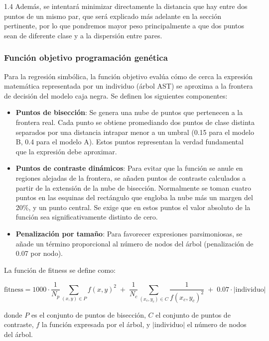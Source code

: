 \documentclass{article}
\begin{document}
\begin{spacing}{1.4}
Además, se intentará minimizar directamente la distancia que hay entre dos puntos de un mismo par, que será explicado más adelante
en la sección pertinente, por lo que pondremos mayor peso principalmente a que dos puntos sean de diferente clase y a la dispersión entre
pares. \\

\subsubsection{Función objetivo programación genética}

Para la regresión simbólica, la función objetivo evalúa cómo de cerca la expresión matemática representada por un individuo (árbol AST) se aproxima a la frontera de decisión del modelo caja negra. Se definen los siguientes componentes:

\begin{itemize}
    \item \textbf{Puntos de bisección}: Se genera una nube de puntos que pertenecen a la frontera real. Cada punto se obtiene promediando dos puntos de clase distinta separados por una distancia intrapar menor a un umbral (0.15 para el modelo B, 0.4 para el modelo A). Estos puntos representan la verdad fundamental que la expresión debe aproximar.
    
    \item \textbf{Puntos de contraste dinámicos}: Para evitar que la función se anule en regiones alejadas de la frontera, se añaden puntos de contraste calculados a partir de la extensión de la nube de bisección. Normalmente se toman cuatro puntos en las esquinas del rectángulo que engloba la nube más un margen del 20\%, y un punto central. Se exige que en estos puntos el valor absoluto de la función sea significativamente distinto de cero.
    
    \item \textbf{Penalización por tamaño}: Para favorecer expresiones parsimoniosas, se añade un término proporcional al número de nodos del árbol (penalización de 0.07 por nodo).
\end{itemize}

La función de fitness se define como:

\[
\text{fitness} = 1000 \cdot \frac{1}{N_p} \sum_{(x,y) \in P} f(x,y)^2 \;+\; \frac{1}{N_c} \sum_{(x_c,y_c) \in C} \frac{1}{f(x_c,y_c)^2} \;+\; 0.07 \cdot |\text{individuo}|
\]

donde $P$ es el conjunto de puntos de bisección, $C$ el conjunto de puntos de contraste, $f$ la función expresada por el árbol, y $|\text{individuo}|$ el número de nodos del árbol.


\end{spacing}
\end{document}
